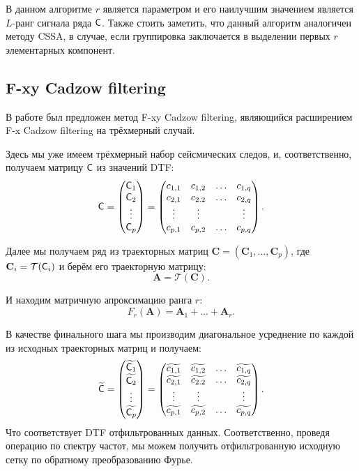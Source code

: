 \documentclass[specialist,
               substylefile = spbu.rtx,
               subf,href,colorlinks=true, 12pt]{disser}
\begin{document}
В данном алгоритме $r$ является параметром и его наилучшим значением является $L$-ранг сигнала ряда $\textsf{C}$. Также стоить заметить, что данный алгоритм аналогичен методу CSSA, в случае, если группировка заключается в выделении первых $r$ элементарных компонент.

\subsection{F-xy Cadzow filtering}
\label{sub:fxy}

В работе \cite{Trickett2008} был предложен метод F-xy Cadzow filtering, являющийся расширением F-x Cadzow filtering на трёхмерный случай.

Здесь мы уже имеем трёхмерный набор сейсмических следов, и, соответственно, получаем матрицу $\textsf{C}$ из значений DTF:
$$\textsf{C} = 
\begin{pmatrix}
           \textsf{C}_1 \\
           \textsf{C}_2\\
           \vdots\\
           \textsf{C}_p
         \end{pmatrix}
= \begin{pmatrix}
           c_{1,1} & c_{1,2} & \ldots & c_{1,q}\\
           c_{2,1} & c_{2.2} & \ldots & c_{2,q}\\
           \vdots & \vdots & & \vdots\\
           c_{p,1} & c_{p,2} & \ldots & c_{p,q}
         \end{pmatrix}.$$

Далее мы получаем ряд из траекторных матриц $\mathbf{C} = (\mathbf{C}_1, \ldots, \mathbf{C}_p)$, где $\mathbf{C}_i = \mathcal{T}(\textsf{C}_i)$ и берём его траекторную матрицу:
$$\mathbf{A} = \mathcal{T}(\mathbf{C}).$$

И находим матричную апроксимацию ранга $r$:
$$F_r(\mathbf{A}) = \mathbf{A}_1 + \ldots + \mathbf{A}_r.$$

В качестве финального шага мы производим диагональное усреднение по каждой из исходных траекторных матриц и получаем:
$$\widetilde{\textsf{C}} = 
\begin{pmatrix}
           \widetilde{\textsf{C}_1} \\
           \widetilde{\textsf{C}_2}\\
           \vdots\\
           \widetilde{\textsf{C}_p}
         \end{pmatrix}
= \begin{pmatrix}
           \widetilde{c_{1,1}} & \widetilde{c_{1,2}} & \ldots & \widetilde{c_{1,q}}\\
           \widetilde{c_{2,1}} & \widetilde{c_{2.2}} & \ldots & \widetilde{c_{2,q}}\\
           \vdots & \vdots & & \vdots\\
           \widetilde{c_{p,1}} & \widetilde{c_{p,2}} & \ldots & \widetilde{c_{p,q}}
         \end{pmatrix}.$$
Что соответствует DTF отфильтрованных данных. Соответственно, проведя операцию по спектру частот, мы можем получить отфильтрованную исходную сетку по обратному преобразованию Фурье.
\end{document}
